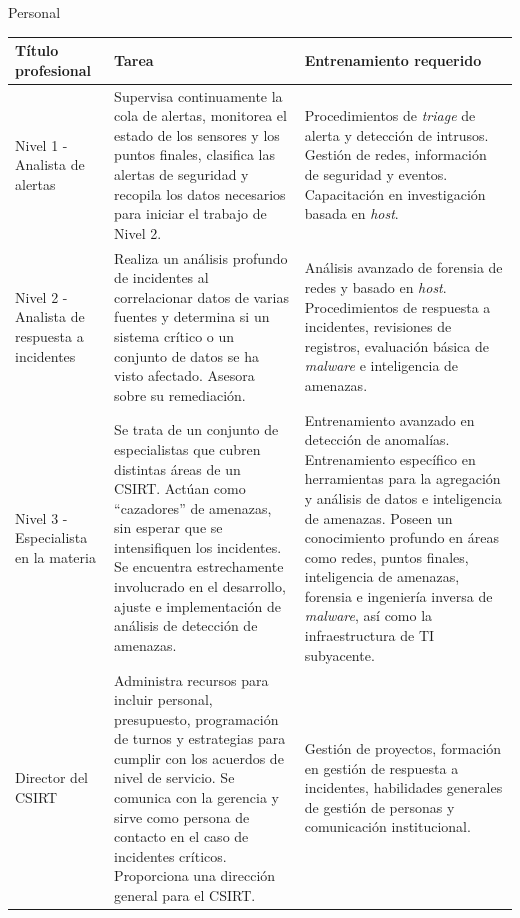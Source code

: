 \begin{section}{Personal}
    \begin{table}%
    \centering
        \begin{tabular}{ | m{10em} | m{16em}| m{11em} | } 
            \hline
            Título profesional & Tarea & Entrenamiento requerido \\ 
            \hline
            Nivel 1 - Analista de alertas & Supervisa continuamente la cola de alertas, monitorea el estado de los sensores y los puntos finales, clasifica las alertas de seguridad y recopila los datos necesarios para iniciar el trabajo de Nivel 2. & Procedimientos de \textit{triage} de alerta y detección de intrusos. Gestión de redes, información de seguridad y eventos. Capacitación en investigación basada en \textit{host}. \\ 
            \hline
            Nivel 2 - Analista de respuesta a incidentes & Realiza un análisis profundo de incidentes al correlacionar datos de varias fuentes y determina si un sistema crítico o un conjunto de datos se ha visto afectado. Asesora sobre su remediación. & Análisis avanzado de forensia de redes y basado en \textit{host}. Procedimientos de respuesta a incidentes, revisiones de registros, evaluación básica de \textit{malware} e inteligencia de amenazas. \\ 
            \hline
            Nivel 3 - Especialista en la materia & Se trata de un conjunto de especialistas que cubren distintas áreas de un CSIRT. 
            Actúan como “cazadores” de amenazas, sin esperar que se intensifiquen los incidentes. Se encuentra estrechamente involucrado en el desarrollo, ajuste e implementación de análisis de detección de amenazas.
             & Entrenamiento avanzado en detección de anomalías. Entrenamiento específico en herramientas para la agregación y análisis de datos e inteligencia de amenazas. 
            Poseen un conocimiento profundo en áreas como redes, puntos finales, inteligencia de amenazas, forensia e ingeniería inversa de \textit{malware}, así como la infraestructura de TI subyacente.
            \\ 
             \hline
            Director del CSIRT & Administra recursos para incluir personal, presupuesto, programación de turnos y estrategias para cumplir con los acuerdos de nivel de servicio. Se comunica con la gerencia y sirve como persona de contacto en el caso de incidentes críticos. Proporciona una dirección general para el CSIRT. & Gestión de proyectos, formación en gestión de respuesta a incidentes, habilidades generales de gestión de personas y comunicación institucional.  \\

\end{tabular}
\end{table}
\end{section}
